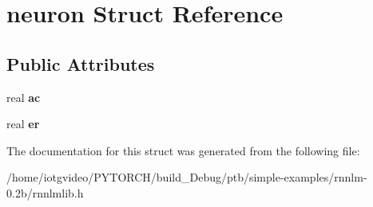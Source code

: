 \hypertarget{structneuron}{}\section{neuron Struct Reference}
\label{structneuron}
\subsection*{Public Attributes}
\begin{DoxyCompactItemize}
\item 
\mbox{\label{structneuron_a31c86846302b55ce2184f91cdaaf283e}} 
real {\bfseries ac}
\item 
\mbox{\label{structneuron_a96d6860799aaa121cafe50539710eb0d}} 
real {\bfseries er}
\end{DoxyCompactItemize}


The documentation for this struct was generated from the following file\+:\begin{DoxyCompactItemize}
\item 
/home/iotgvideo/\+P\+Y\+T\+O\+R\+C\+H/build\+\_\+\+Debug/ptb/simple-\/examples/rnnlm-\/0.\+2b/rnnlmlib.\+h\end{DoxyCompactItemize}

